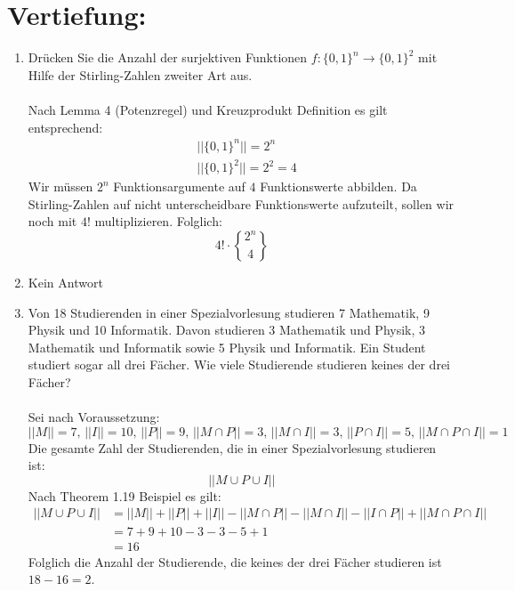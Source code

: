 

\DeclareRobustCommand{\stirling}{\genfrac\{\}{0pt}{}}

    \maketitle
    \section*{Vertiefung:}
    \begin{enumerate}[label=(\alph*)]
        \item Drücken Sie die Anzahl der surjektiven Funktionen 
        $f : \{0, 1\}^n \to \{0, 1\}^2$ mit Hilfe der Stirling-Zahlen zweiter Art aus.\\\\
        Nach Lemma 4 (Potenzregel) und Kreuzprodukt Definition es gilt entsprechend:
        \begin{align*}
	        &||\{0, 1\}^n|| = 2^n \\
	        &|| \{0, 1\}^2|| = 2^2 = 4
	    \end{align*}
	    Wir m\"ussen $2^n$ Funktionsargumente auf $4$ Funktionswerte abbilden. Da Stirling-Zahlen auf 
	    nicht unterscheidbare Funktionswerte aufzuteilt, sollen wir noch mit $4!$ multiplizieren.  
	    Folglich: \[4!\cdot\stirling{2^n}{4}\]

        \item Kein Antwort

        \item Von 18 Studierenden in einer Spezialvorlesung studieren 7 Mathematik, 9 Physik und 10
		Informatik. Davon studieren 3 Mathematik und Physik, 3 Mathematik und Informatik
		sowie 5 Physik und Informatik. Ein Student studiert sogar all drei Fächer. Wie viele
		Studierende studieren keines der drei Fächer?\\\\
		Sei nach Voraussetzung:
		\[||M|| = 7,\, ||I|| = 10,\, ||P|| = 9,\, ||M \cap P|| = 3,\, ||M \cap I|| = 3,\, 
		  ||P \cap I|| = 5,\, ||M \cap P \cap I|| = 1\]
		Die gesamte Zahl der Studierenden, die in einer Spezialvorlesung studieren ist:
		\[||M \cup P \cup I||\]
		Nach Theorem 1.19 Beispiel es gilt:
		\begin{align*}
	        ||M\cup P\cup I|| &= ||M||+||P||+||I||-||M\cap P||-||M\cap I||-||I \cap P||+||M \cap P \cap I||\\
	        &= 7 + 9 + 10 - 3 - 3 - 5 + 1 \\
	        &= 16
        \end{align*}
        Folglich die Anzahl der Studierende, die keines der drei Fächer studieren ist $18-16 = 2$.


\end{enumerate}
